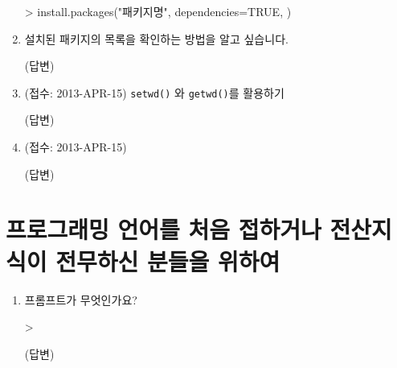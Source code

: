 \documentclass{article}
\begin{document}
\begin{enumerate}
	\begin{Schunk}
	\begin{Soutput}
	> install.packages("패키지명", dependencies=TRUE, )
	\end{Soutput}
	\end{Schunk}

	\item 설치된 패키지의 목록을 확인하는 방법을 알고 싶습니다.
	
	\textsf{(답변)} 
	
	\item (접수: 2013-APR-15) \texttt{setwd()} 와 \texttt{getwd()}를 활용하기 
	
	\textsf{(답변)}
	
	\item (접수: 2013-APR-15)
	
	\textsf{(답변)}

\end{enumerate}


%
%
%

\section{프로그래밍 언어를 처음 접하거나 전산지식이 전무하신 분들을 위하여}

\begin{enumerate}
	\item 프롬프트가 무엇인가요? 
	\begin{Schunk}
	\begin{Soutput}
	>
	\end{Soutput}
	\end{Schunk}
	
	\textsf{(답변)} 

\end{enumerate}



%
%
%
\end{document}

